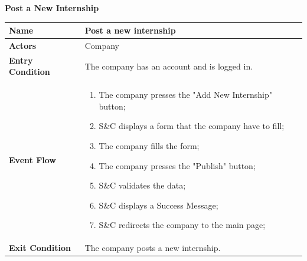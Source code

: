 \begin{enumerate}[label=\textbf{[US\arabic*]}, left = 0pt, align = left, resume]

            \newpage
            \item \textbf{Post a New Internship}
            
            \begin{longtable}{|l|p{11cm}|}  
                \hline
                \textbf{Name} & 
                    \textbf{Post a new internship} \\
                \hline
                
                \textbf{Actors} & 
                    Company \\
                \hline
                
                \textbf{Entry Condition} & 
                    The company has an account and is logged in. \\
                \hline
                
                \textbf{Event Flow} &
                    \begin{enumerate}[label=\arabic*., itemsep=0.2em]
                        \item The company presses the "Add New Internship" button;
                        \item S\&C displays a form that the company have to fill;
                        \item The company fills the form;
                        \item The company presses the "Publish" button;
                        \item S\&C validates the data;
                        \item S\&C displays a Success Message;
                        \item S\&C redirects the company to the main page;
                    \end{enumerate} \\
                \hline
                
                \textbf{Exit Condition} & 
                    The company posts a new internship. \\
                \hline
                

\end{longtable}
\end{enumerate}
